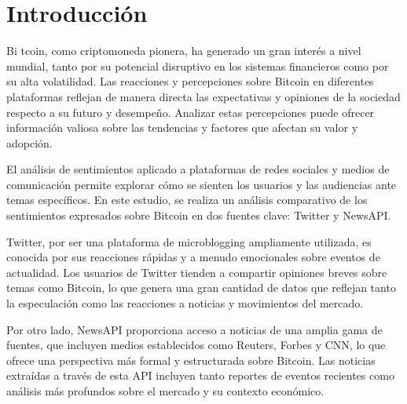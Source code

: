 \documentclass[journal]{IEEEtran}
\begin{document}



\section{Introducción}
% 
% 
% 
% 
\IEEEPARstart
{B}{i} tcoin, como criptomoneda pionera, ha generado un gran interés a nivel mundial, tanto por su potencial disruptivo en los sistemas financieros como por su alta volatilidad. Las reacciones y percepciones sobre Bitcoin en diferentes plataformas reflejan de manera directa las expectativas y opiniones de la sociedad respecto a su futuro y desempeño. Analizar estas percepciones puede ofrecer información valiosa sobre las tendencias y factores que afectan su valor y adopción.

El análisis de sentimientos aplicado a plataformas de redes sociales y medios de comunicación permite explorar cómo se sienten los usuarios y las audiencias ante temas específicos. En este estudio, se realiza un análisis comparativo de los sentimientos expresados sobre Bitcoin en dos fuentes clave: Twitter y NewsAPI.

Twitter, por ser una plataforma de microblogging ampliamente utilizada, es conocida por sus reacciones rápidas y a menudo emocionales sobre eventos de actualidad. Los usuarios de Twitter tienden a compartir opiniones breves sobre temas como Bitcoin, lo que genera una gran cantidad de datos que reflejan tanto la especulación como las reacciones a noticias y movimientos del mercado.

Por otro lado, NewsAPI proporciona acceso a noticias de una amplia gama de fuentes, que incluyen medios establecidos como Reuters, Forbes y CNN, lo que ofrece una perspectiva más formal y estructurada sobre Bitcoin. Las noticias extraídas a través de esta API incluyen tanto reportes de eventos recientes como análisis más profundos sobre el mercado y su contexto económico.
\end{document}
